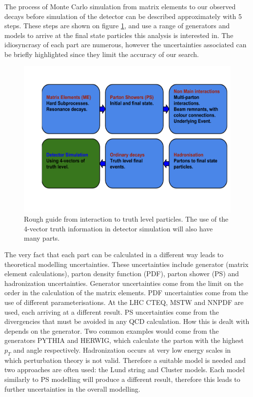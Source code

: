 The process of Monte Carlo simulation from matrix elements to our observed decays before simulation of the detector can be described approximately with 5 steps\cite{Jmorris}. These steps are shown on figure \ref{fig:guide}, and use a range of generators and models to arrive at the final state particles this analysis is interested in. The idiosyncrasy of each part are numerous, however the uncertainties associated can be briefly highlighted since they limit the accuracy of our search.
\begin{figure}[H]
\hspace{-1cm}
\includegraphics[scale=0.5]{figures/MC-simulation-truthEvent.pdf}
\caption{Rough guide from interaction to truth level particles. The use of the 4-vector truth information in detector simulation will also have many parts.}
\label{fig:guide}
\end{figure}

The very fact that each part can be calculated in a different way leads to theoretical modelling uncertainties. These uncertainties include generator (matrix element calculations), parton density function (PDF), parton shower (PS) and hadronization uncertainties. 
Generator uncertainties come from the limit on the order in the calculation of the matrix elements. PDF uncertainties come from the use of different parameterisations. At the LHC CTEQ, MSTW and NNPDF are used, each arriving at a different result. PS uncertainties come from the divergencies that must be avoided in any QCD calculation. How this is dealt with depends on the generator. Two common examples would come from the generators PYTHIA and HERWIG, which calculate the parton with the highest $p_T$ and angle respectively. Hadronization occurs at very low energy scales in which perturbation theory is not valid. Therefore a suitable model is needed and two approaches are often used: the Lund string and Cluster models. Each model similarly to PS modelling will produce a different result, therefore this leads to further uncertainties in the overall modelling. 

